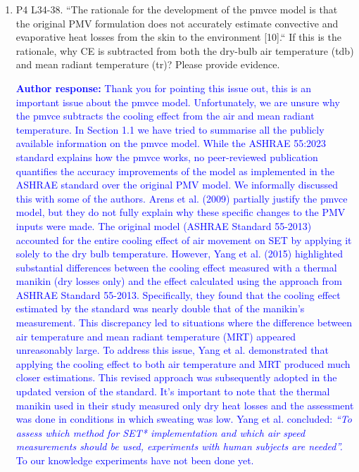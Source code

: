 \documentclass[a4paper, 10pt]{letter}
\newcommand{\response}[1]{\textcolor{blue}{\textbf{Author response:} #1}}
\begin{document}
\begin{letter}
\begin{enumerate}
            \item P4 L34-38.
            ``The rationale for the development of the \acs{pmvce} model is that the original PMV
            formulation does not accurately estimate convective and evaporative heat losses from
            the skin to the environment [10].`` If this is the rationale, why CE is subtracted from both
            the dry-bulb air temperature (tdb) and mean radiant temperature (tr)?
            Please provide evidence.

            \response{
                Thank you for pointing this issue out, this is an important issue about the \ac{pmvce} model.
                Unfortunately, we are unsure why the \ac{pmvce} subtracts the cooling effect from the air and mean radiant temperature. 
                In Section 1.1 we have tried to summarise all the publicly available information on the \ac{pmvce} model.
                While the ASHRAE 55:2023 standard explains how the \ac{pmvce} works, no peer-reviewed publication quantifies the accuracy improvements of the model as implemented in the ASHRAE standard over the original PMV model. 
                We informally discussed this with some of the authors.
                Arens et al. (2009) partially justify the \ac{pmvce} model, but they do not fully explain why these specific changes to the PMV inputs were made. 
                The original model (ASHRAE Standard 55-2013) accounted for the entire cooling effect of air movement on SET by applying it solely to the dry bulb temperature. 
                However, Yang et al. (2015) highlighted substantial differences between the cooling effect measured with a thermal manikin (dry losses only) and the effect calculated using the approach from ASHRAE Standard 55-2013. 
                Specifically, they found that the cooling effect estimated by the standard was nearly double that of the manikin’s measurement. 
                This discrepancy led to situations where the difference between air temperature and mean radiant temperature (MRT) appeared unreasonably large. 
                To address this issue, Yang et al. demonstrated that applying the cooling effect to both air temperature and MRT produced much closer estimations. 
                This revised approach was subsequently adopted in the updated version of the standard. 
                It’s important to note that the thermal manikin used in their study measured only dry heat losses and the assessment was done in conditions in which sweating was low. 
                Yang et al. concluded: \textit{``To assess which method for SET* implementation and which air speed measurements should be used, experiments with human subjects are needed''.}
                To our knowledge experiments have not been done yet.  
            }


\end{enumerate}
\end{letter}
\end{document}
